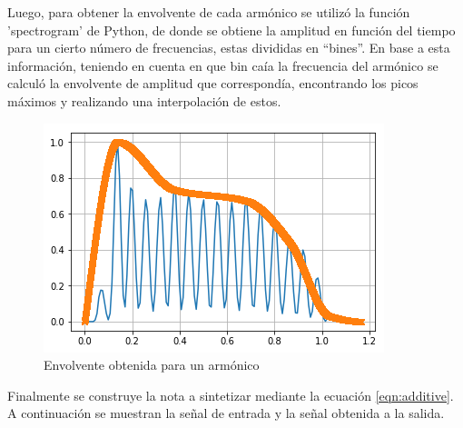 \documentclass[assd_tp2_main.tex]{subfiles}
\begin{document}
Luego, para obtener la envolvente de cada armónico se utilizó la función 'spectrogram' de Python, de donde se obtiene la amplitud en función del tiempo para un cierto número de frecuencias, estas divididas en ``bines''. 
En base a esta información, teniendo en cuenta en que bin caía la frecuencia del armónico se calculó la envolvente de amplitud que correspondía, encontrando los picos máximos y realizando una interpolación de estos.

\begin{figure}[H]
	\centering
	\includegraphics[scale=0.75]{graficos/envelope.png}
	\caption{Envolvente obtenida para un armónico}
\end{figure} 
\newpage
Finalmente se construye la nota a sintetizar mediante la ecuación \ref{eqn:additive}. A continuación se muestran la señal de entrada y la señal obtenida a la salida.
\end{document}
